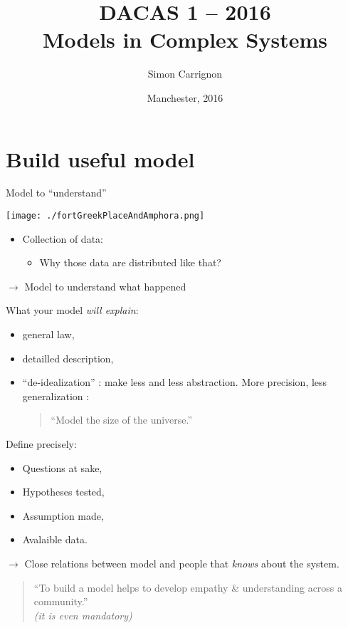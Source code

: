 \documentclass[8pt, handout=show,notes=show]{beamer}
\title{DACAS 1 -- 2016\\
	Models in Complex Systems
}
\date{Manchester, 2016}
\author{Simon Carrignon}
\begin{document}
\section{Build useful model}

\begin{frame}{Model to ``understand''}
	
	\begin{center}
		\texttt{[image: ./fortGreekPlaceAndAmphora.png]}
	\end{center}
	\begin{itemize}
		\item Collection of data:
			\begin{itemize}
				\item Why those data are distributed like that?
			\end{itemize}
	\end{itemize}
	\vfill
	$\rightarrow$ Model to understand what happened

\end{frame}

\begin{frame}
	What your model \emph{will explain}:\\
	\begin{itemize}
		\item general law,
		\item detailled description,
		\item ``de-idealization'' : make less and less abstraction. More precision, less generalization : 
	\begin{quote}
		``Model the size of the universe.''
	\end{quote}
	\end{itemize}
	\vfill
	\begin{alertblock}{Define precisely:}
		\begin{itemize}
			\item Questions at sake,
			\item Hypotheses tested,
			\item Assumption made,
			\item Avalaible data.
		\end{itemize}
	\end{alertblock}
	\vfil
	$\rightarrow$ Close relations between model and people that \emph{knows} about the system.
	\begin{quote}
		``To build a model helps to develop empathy \& understanding across a community.''\\
		\emph{(it is even mandatory)}
	\end{quote}


\end{frame}
\end{document}
